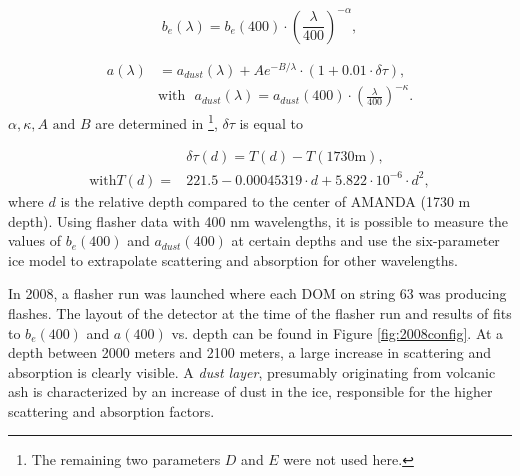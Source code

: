\begin{equation}
b_e(\lambda)  = b_e(400) \cdot \left( \frac{\lambda}{400}\right)^{-\alpha},
\end{equation}

\begin{equation}
\begin{split}
a(\lambda) &= a_{dust}(\lambda) + A e^{-B/\lambda} \cdot (1+0.01 \cdot \delta \tau), \\
&\textrm{with} \ \ \ a_{dust}(\lambda) = a_{dust}(400) \cdot \left( \frac{\lambda}{400}\right)^{-\kappa}.
\end{split}
\end{equation}
$\alpha, \kappa, A \textrm{ and } B$ are determined in \cite{Ackermann:2006pva}\footnote{The remaining two parameters $D$ and $E$ were not used here.}, $\delta \tau$ is equal to

\begin{equation}
\begin{split}
&\delta \tau(d) = T(d) - T(1730 \textrm{m}), \\ 
\textrm{with} T(d) = &221.5 - 0.00045319 \cdot d + 5.822 \cdot 10^{-6} \cdot d^2,
\end{split}
\end{equation}
where $d$ is the relative depth compared to the center of AMANDA (1730 m depth). Using flasher data with 400 nm wavelengths, it is possible to measure the values of $b_e(400)$ and $a_{dust}(400)$ at certain depths and use the six-parameter ice model to extrapolate scattering and absorption for other wavelengths. 

In 2008, a flasher run was launched where each DOM on string 63 was producing flashes. The layout of the detector at the time of the flasher run and results of fits to $b_{e}(400)$ and $a(400)$ vs. depth can be found in Figure \ref{fig:2008config}. At a depth between 2000 meters and 2100 meters, a large increase in scattering and absorption is clearly visible. A \textit{dust layer}, presumably originating from volcanic ash is characterized by an increase of dust in the ice, responsible for the higher scattering and absorption factors.

